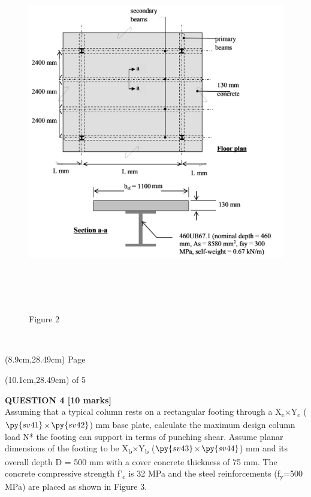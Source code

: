 \documentclass[a4paper,11pt]{article}
\begin{document}
\begin{figure}[ht]
\includegraphics[width=15.92cm, height=15.81cm]{Figure2.png}\\
\centering
Figure 2\\
\centering
\end{figure}
\\
\begin{textblock*}{5cm}(8.9cm,28.49cm)
Page
\end{textblock*}
\begin{textblock*}{5cm}(10.1cm,28.49cm)
of 5
\end{textblock*}
\newpage
\noindent
\textbf{QUESTION 4 [10 marks]}\\
Assuming that a typical column rests on a rectangular footing through a X\textsubscript{c}$\times$Y\textsubscript{c} ($\py{sv41}$$\times$$\py{sv42}$) mm base plate, calculate the maximum design column load N* the footing can support in terms of punching shear. Assume planar dimensions of the footing to be X\textsubscript{b}$\times$Y\textsubscript{b} ($\py{sv43}$$\times$$\py{sv44}$) mm and its overall depth D = 500 mm with a cover concrete thickness of 75 mm. The concrete compressive strength f'\textsubscript{c} is 32 MPa and the steel reinforcements (f\textsubscript{y}=500 MPa) are placed as shown in Figure 3.\\
\end{document}
